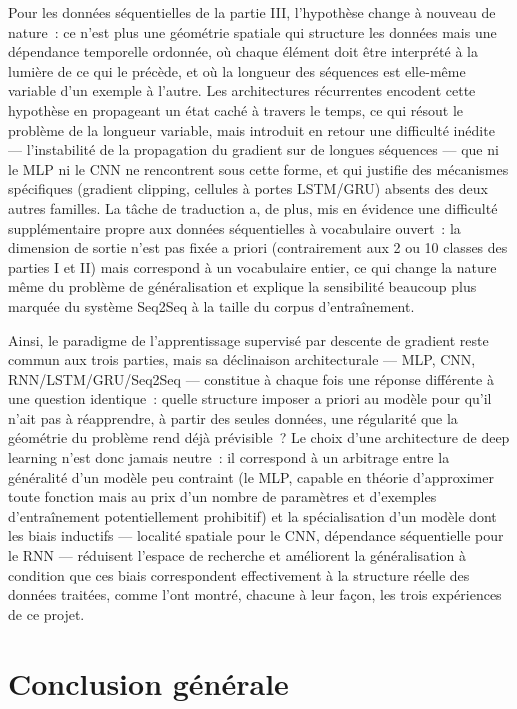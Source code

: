 \documentclass[11pt,a4paper]{article}
\begin{document}
Pour les données séquentielles de la partie III, l'hypothèse change à nouveau de nature~: ce n'est plus une géométrie spatiale qui structure les données mais une dépendance temporelle ordonnée, où chaque élément doit être interprété à la lumière de ce qui le précède, et où la longueur des séquences est elle-même variable d'un exemple à l'autre. Les architectures récurrentes encodent cette hypothèse en propageant un état caché à travers le temps, ce qui résout le problème de la longueur variable, mais introduit en retour une difficulté inédite --- l'instabilité de la propagation du gradient sur de longues séquences --- que ni le MLP ni le CNN ne rencontrent sous cette forme, et qui justifie des mécanismes spécifiques (gradient clipping, cellules à portes LSTM/GRU) absents des deux autres familles. La tâche de traduction a, de plus, mis en évidence une difficulté supplémentaire propre aux données séquentielles à vocabulaire ouvert~: la dimension de sortie n'est pas fixée a priori (contrairement aux 2 ou 10 classes des parties I et II) mais correspond à un vocabulaire entier, ce qui change la nature même du problème de généralisation et explique la sensibilité beaucoup plus marquée du système Seq2Seq à la taille du corpus d'entraînement.

Ainsi, le paradigme de l'apprentissage supervisé par descente de gradient reste commun aux trois parties, mais sa déclinaison architecturale --- MLP, CNN, RNN/LSTM/GRU/Seq2Seq --- constitue à chaque fois une réponse différente à une question identique~: quelle structure imposer a priori au modèle pour qu'il n'ait pas à réapprendre, à partir des seules données, une régularité que la géométrie du problème rend déjà prévisible~? Le choix d'une architecture de deep learning n'est donc jamais neutre~: il correspond à un arbitrage entre la généralité d'un modèle peu contraint (le MLP, capable en théorie d'approximer toute fonction mais au prix d'un nombre de paramètres et d'exemples d'entraînement potentiellement prohibitif) et la spécialisation d'un modèle dont les biais inductifs --- localité spatiale pour le CNN, dépendance séquentielle pour le RNN --- réduisent l'espace de recherche et améliorent la généralisation à condition que ces biais correspondent effectivement à la structure réelle des données traitées, comme l'ont montré, chacune à leur façon, les trois expériences de ce projet.

\section{Conclusion générale}
\end{document}
